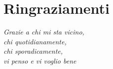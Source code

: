 \documentclass[12pt,a4paper,twoside]{report}
\begin{document}

\restoregeometry



\clearpage{\pagestyle{empty}\cleardoublepage}




\chapter*{Ringraziamenti}
{}
\begin{minipage}[t]{0.47\textwidth}
{\normalsize{\it Grazie a chi mi sta vicino,\\
chi quotidianamente,\\
chi sporadicamente,\\
vi penso e vi voglio bene}}
\end{minipage}
\newpage



\tableofcontents %
\rhead[\fancyplain{}{\bfseries\leftmark}]{\fancyplain{}{\bfseries\thepage}}



\newpage
\renewcommand{\listfigurename}{Elenco delle Figure}
{}
\listoffigures %



\newpage
\renewcommand{\listtablename}{Elenco delle Tabelle}
{}
\listoftables %



\clearpage
{} %
\end{document}
